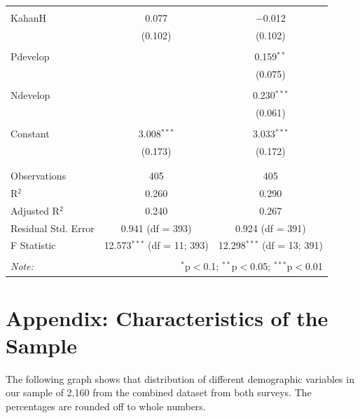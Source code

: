 \documentclass[
]{article}
\begin{document}
\begin{table}[!htbp]
\begin{tabular}{@{\extracolsep{5pt}}lcc}
  & & \\ 
 KahanH & 0.077 & $-$0.012 \\ 
  & (0.102) & (0.102) \\ 
  & & \\ 
 Pdevelop &  & 0.159$^{**}$ \\ 
  &  & (0.075) \\ 
  & & \\ 
 Ndevelop &  & 0.230$^{***}$ \\ 
  &  & (0.061) \\ 
  & & \\ 
 Constant & 3.008$^{***}$ & 3.033$^{***}$ \\ 
  & (0.173) & (0.172) \\ 
  & & \\ 
\hline \\[-1.8ex] 
Observations & 405 & 405 \\ 
R$^{2}$ & 0.260 & 0.290 \\ 
Adjusted R$^{2}$ & 0.240 & 0.267 \\ 
Residual Std. Error & 0.941 (df = 393) & 0.924 (df = 391) \\ 
F Statistic & 12.573$^{***}$ (df = 11; 393) & 12.298$^{***}$ (df = 13; 391) \\ 
\hline 
\hline \\[-1.8ex] 
\textit{Note:}  & \multicolumn{2}{r}{$^{*}$p$<$0.1; $^{**}$p$<$0.05; $^{***}$p$<$0.01} \\ 
\end{tabular} 
\end{table} 
\endgroup

\newpage

\newpage

\hypertarget{appendix-characteristics-of-the-sample}{%
\section{Appendix: Characteristics of the
Sample}\label{appendix-characteristics-of-the-sample}}

The following graph shows that distribution of different demographic
variables in our sample of 2,160 from the combined dataset from both
surveys. The percentages are rounded off to whole numbers.
\end{document}
